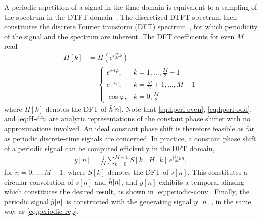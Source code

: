 %
\NewL A periodic repetition of a signal in the time domain
is equivalent to a sampling of the spectrum in the DTFT domain~\cite[Sec.~8.4]{oppenheim}.
The discretized DTFT spectrum then constitutes
the discrete Fourier transform (DFT) spectrum~\cite[Sec.~8.5]{oppenheim},
for which periodicity of the signal and the spectrum are inherent.
The DFT coefficients for even $M$ read
\begin{align}
H[k] &= H(e^{i\frac{2\pi}{M}k})\label{eq:H-dft}\\
&= \nonumber
\begin{cases}
e^{+i\varphi},& k = 1,\ldots,\tfrac{M}{2}-1\\
e^{-i\varphi},& k = \tfrac{M}{2} + 1,\ldots, M-1\\
\cos\varphi,& k = 0, \tfrac{M}{2}
\end{cases}
\end{align}
where $H[k]$ denotes the DFT of $\tilde{h}[n]$.
Note that \eqref{eq:hperi-even}, \eqref{eq:hperi-odd}, and \eqref{eq:H-dft}
are analytic representations of the constant phase shifter
with no approximations involved.
An ideal constant phase shift is therefore feasible
as far as periodic discrete-time signals are concerned.
%
\NewL In practice, a constant phase shift of a periodic signal
can be computed efficiently in the DFT domain,
\begin{align}
y[n] = \frac{1}{M} \sum_{k=0}^{M-1} S[k] \: H[k] \: e^{i\frac{2\pi}{M}kn},
\label{eq:dft-conv}
\end{align}
for $n=0,\ldots,M-1$, where $S[k]$ denotes the DFT of $s[n]$.
This constitutes a circular convolution of $s[n]$ and $\tilde{h}[n]$,
and $y[n]$ exhibits a temporal aliasing which constitutes the desired result,
as shown in \eqref{eq:periodic-conv}.
Finally, the periodic signal $\tilde{y}[n]$ is constructed
with the generating signal $y[n]$, in the same way as \eqref{eq:periodic-rep}.
